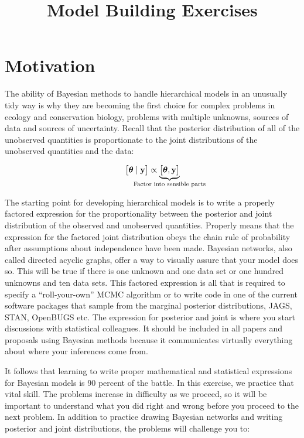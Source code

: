 \documentclass[12pt, oneside]{article}
\title{\vspace{-1cm}Model  Building Exercises}
\begin{document}
\maketitle

\thispagestyle{fancy}

\section*{Motivation}
The ability of Bayesian methods to handle hierarchical models in an unusually tidy way is why they are becoming the first choice for complex problems in ecology and conservation biology, problems with multiple unknowns, sources of data and sources of uncertainty. Recall that the posterior distribution of all of the unobserved quantities is proportionate to the joint distributions of the unobserved quantities and the data: 

$$\big[\bm{\theta}\mid \mathbf{y}\big]\propto\underbrace{\big[\bm{\theta},\mathbf{y}\big]}_{\mathclap{\text{Factor into sensible parts}}}\\[1em]$$

The starting point for developing hierarchical models is to write a properly factored expression for the proportionality between the posterior and joint distribution of the observed and unobserved quantities. Properly means that the expression for the factored joint distribution obeys the chain rule of probability after assumptions about independence have been made. Bayesian networks, also called directed acyclic graphs, offer a way to visually assure that your model does so. This will be true if there is one unknown and one data set or one hundred unknowns and ten data sets. This factored expression is all that is required to specify a \enquote{roll-your-own} MCMC algorithm or to write code in one of the current software packages that sample from the marginal posterior distributions, JAGS, STAN, OpenBUGS etc. The expression for posterior and joint is where you start discussions with statistical colleagues. It should be included in all papers and proposals using Bayesian methods because it communicates virtually everything about where your inferences come from. 

It follows that learning to write proper mathematical and statistical expressions for Bayesian models is 90 percent of the battle. In this exercise, we practice that vital skill. The problems increase in difficulty as we proceed, so it will be important to understand what you did right and wrong before you proceed to the next problem. In addition to practice drawing Bayesian networks and writing posterior and joint distributions, the problems will challenge you to:
\end{document}
